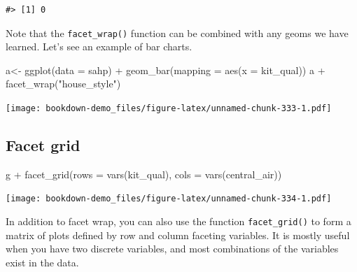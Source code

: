 \documentclass[
]{book}
\newenvironment{Shaded}{\begin{snugshade}}{\end{snugshade}}
\newcommand{\AttributeTok}[1]{\textcolor[rgb]{0.77,0.63,0.00}{#1}}
\newcommand{\FunctionTok}[1]{\textcolor[rgb]{0.00,0.00,0.00}{#1}}
\newcommand{\NormalTok}[1]{#1}
\newcommand{\OtherTok}[1]{\textcolor[rgb]{0.56,0.35,0.01}{#1}}
\newcommand{\SpecialCharTok}[1]{\textcolor[rgb]{0.00,0.00,0.00}{#1}}
\newcommand{\StringTok}[1]{\textcolor[rgb]{0.31,0.60,0.02}{#1}}
\begin{document}
\begin{Shaded}
\end{Shaded}

\begin{verbatim}
#> [1] 0
\end{verbatim}

Note that the \texttt{facet\_wrap()} function can be combined with any geoms we have learned. Let's see an example of bar charts.

\begin{Shaded}
\begin{Highlighting}[]
\NormalTok{a}\OtherTok{\textless{}{-}} \FunctionTok{ggplot}\NormalTok{(}\AttributeTok{data =}\NormalTok{ sahp) }\SpecialCharTok{+} \FunctionTok{geom\_bar}\NormalTok{(}\AttributeTok{mapping =} \FunctionTok{aes}\NormalTok{(}\AttributeTok{x =}\NormalTok{ kit\_qual))}
\NormalTok{a }\SpecialCharTok{+} \FunctionTok{facet\_wrap}\NormalTok{(}\StringTok{"house\_style"}\NormalTok{)}
\end{Highlighting}
\end{Shaded}

\texttt{[image: bookdown-demo\_files/figure-latex/unnamed-chunk-333-1.pdf]}

\hypertarget{facet-grid}{%
\subsection{Facet grid}\label{facet-grid}}

\begin{Shaded}
\begin{Highlighting}[]
\NormalTok{g }\SpecialCharTok{+} \FunctionTok{facet\_grid}\NormalTok{(}\AttributeTok{rows =} \FunctionTok{vars}\NormalTok{(kit\_qual), }\AttributeTok{cols =} \FunctionTok{vars}\NormalTok{(central\_air))}
\end{Highlighting}
\end{Shaded}

\texttt{[image: bookdown-demo\_files/figure-latex/unnamed-chunk-334-1.pdf]}

In addition to facet wrap, you can also use the function \texttt{facet\_grid()} to form a matrix of plots defined by row and column faceting variables. It is mostly useful when you have two discrete variables, and most combinations of the variables exist in the data.
\end{document}
